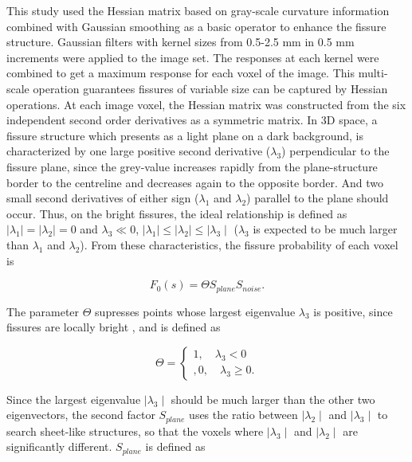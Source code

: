 \documentclass[]{spie}  %
\begin{document}
{This study used the Hessian matrix based on gray-scale curvature information combined with Gaussian smoothing as a basic operator to enhance the fissure structure. Gaussian filters with kernel sizes from 0.5-2.5 mm in 0.5 mm increments were applied to the image set. The responses at each kernel were combined to get a maximum response for each voxel of the image. This multi-scale operation guarantees fissures of variable size can be captured by Hessian operations. At each image voxel, the Hessian matrix was constructed from the six independent second order derivatives as a symmetric matrix. In 3D space, a fissure structure which presents as a light plane on a dark background, is characterized by one large positive second derivative ($\lambda_3$) perpendicular to the fissure plane, since the grey-value increases rapidly from the plane-structure border to the centreline and decreases again to the opposite border. And two small second derivatives of either sign ($\lambda_1$ and $\lambda_2$) parallel to the plane should occur. Thus, on the bright fissures, the ideal relationship is defined as $\mid\lambda_{1}\mid = \mid\lambda_{2}\mid = 0$ and $\lambda_{3} \ll 0$, $\mid\lambda_{1}\mid\leq\mid\lambda_{2}\mid\leq\mid\lambda_{3}\mid$ ($\lambda_3$ is expected to be much larger than $\lambda_1$ and $\lambda_2$). From these characteristics, the fissure probability of each voxel is

\begin{equation}
\label{eq:FissureHessian1}
F_0(s) = \Theta S_{plane} S_{noise}.
\end{equation}

The parameter $\Theta$ supresses points whose largest eigenvalue $\lambda_{3}$ is positive, since fissures are locally bright , and is defined as

\begin{equation}
\label{eq:FissureHessian2}
\Theta = \begin{cases}
         1,\quad \lambda_{3}< 0\\,
         0, \quad \lambda_{3}\geq0.
         \end{cases}
\end{equation}

Since the largest eigenvalue $\mid\lambda_{3}\mid$ should be much larger than the other two eigenvectors, the second factor $S_{plane}$ uses the ratio between $\mid\lambda_{2}\mid$ and $\mid\lambda_{3}\mid$ to search sheet-like structures, so that the voxels where $\mid\lambda_{3}\mid$ and $\mid\lambda_{2}\mid$ are significantly different. $S_{plane}$ is defined as

}
\end{document}

